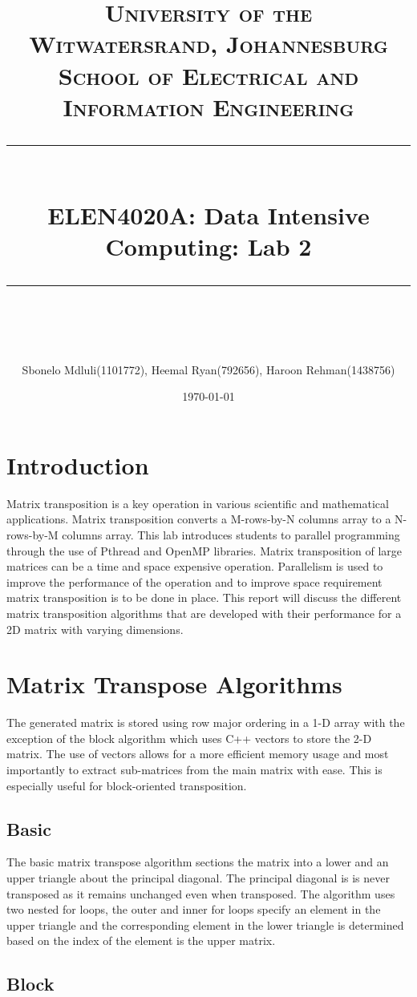 \documentclass[10pt,journal]{article}
\title{	
	\normalfont\largesize
	\textbf{\textsc{University of the Witwatersrand, Johannesburg}}\\
	\textsc{School of Electrical and Information Engineering}\\ 
	\vspace{5pt} %
	\rule{\linewidth}{0.5pt}\\ %
	\vspace{10pt} %
	{\huge ELEN4020A: Data Intensive Computing: Lab 2}\\ %
	\vspace{1pt} %
	\rule{\linewidth}{2pt}\\ %
	\vspace{1pt} %
}
\author{ Sbonelo Mdluli(1101772), Heemal Ryan(792656), Haroon Rehman(1438756) }
\date{\large\today}
\begin{document}
\maketitle 

\section{Introduction}
Matrix transposition is a key operation in various scientific and mathematical applications. Matrix transposition converts a M-rows-by-N columns array to a N-rows-by-M columns array. This lab introduces students to parallel programming through the use of Pthread and OpenMP libraries. Matrix transposition of large matrices can be a time and space expensive operation. Parallelism is used to improve the performance of the operation and to improve space requirement matrix transposition is to be done in place. This report will discuss the different matrix transposition algorithms that are developed with their performance for a 2D matrix with varying dimensions. 

\section{Matrix Transpose Algorithms}

The generated matrix is stored using row major ordering in a 1-D array with the exception of the block algorithm which uses C++ vectors to store the 2-D matrix. The use of vectors allows for a more efficient memory usage and most importantly to extract sub-matrices from the main matrix with ease. This is especially useful for block-oriented transposition.   

\subsection{Basic}

The basic matrix transpose algorithm sections the matrix into a lower and an upper triangle about the principal diagonal. The principal diagonal is is never transposed as it remains unchanged even when transposed. The algorithm uses two nested for loops, the outer and inner for loops specify an element in the upper triangle and the corresponding element in the lower triangle is determined based on the index of the element is the upper matrix.

\subsection{Block}
\end{document}
